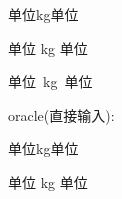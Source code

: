 \documentclass{article}
\begin{document}
单位\unit{kg}单位

单位 \unit{kg} 单位

单位~\unit{kg}~单位

\bigskip
oracle(直接输入):

单位kg单位

单位 kg 单位
\end{document}
